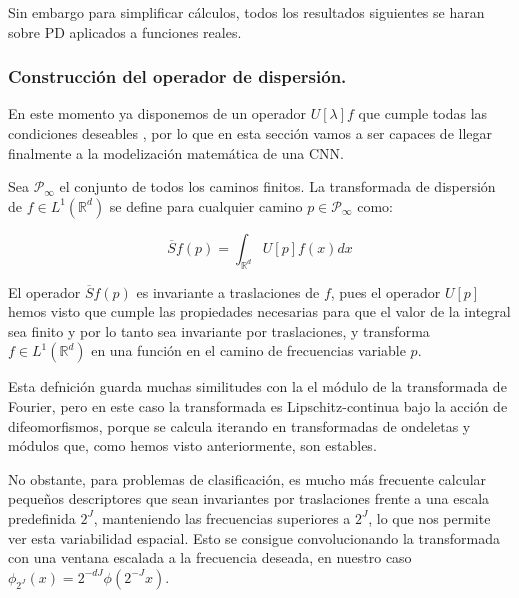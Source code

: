 \medskip

\noindent Sin embargo para simplificar cálculos, todos los resultados siguientes se haran sobre PD aplicados a funciones reales.

\subsubsection{Construcción del operador de dispersión.}

\noindent En este momento ya disponemos de un operador $U[\lambda] f$ que cumple todas las condiciones deseables , por lo que en esta sección vamos a ser capaces de llegar finalmente a la modelización matemática de una CNN.

\begin{definicion} \label{def:S_barra}
Sea $\mathcal{P}_\infty$ el conjunto de todos los caminos finitos. La transformada de dispersión de $f \in L^1(\mathbb{R}^d)$ se define para cualquier camino $p \in \mathcal{P}_\infty$ como:

\begin{equation}
  \overline{S}f(p)=\int_{\mathbb{R}^d}U[p]f(x)dx 
\end{equation}

\end{definicion}

\medskip

\noindent El operador $\overline{S}f(p)$ es invariante a traslaciones de $f$, pues el operador $U[p]$ hemos visto que cumple las propiedades necesarias para que el valor de la integral sea finito y por lo tanto sea invariante por traslaciones, y transforma $f \in L^1(\mathbb{R}^d)$ en una función en el camino de frecuencias variable $p$.

\medskip

\noindent Esta defnición guarda muchas similitudes con la el módulo de la transformada de Fourier, pero en este caso la transformada es Lipschitz-continua bajo la acción de difeomorfismos, porque se calcula iterando en transformadas de ondeletas y módulos que, como hemos visto anteriormente, son estables. 

\medskip

\noindent No obstante, para problemas de clasificación, es mucho más frecuente calcular pequeños descriptores que sean invariantes por traslaciones frente a una escala predefinida $2^J$, manteniendo las frecuencias superiores a $2^J$, lo que nos permite ver esta variabilidad espacial. Esto se consigue convolucionando la transformada con una ventana escalada a la frecuencia deseada, en nuestro caso $\phi_{2^J}(x)=2^{-dJ}\phi(2^{-J}x)$. 

